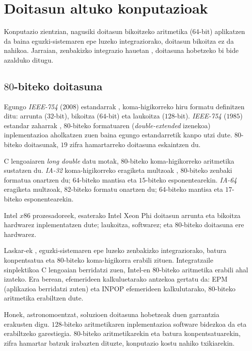 
\section{Doitasun altuko konputazioak}


Konputazio zientzian, nagusiki doitasun bikoitzeko aritmetika (64-bit) aplikatzen da baina eguzki-sistemaren epe luzeko integraziorako, doitasun bikoitza ez da nahikoa. Jarraian, zenbakizko integrazio hauetan \cite{Laskar2015}, doitasuna hobetzeko bi bide azalduko ditugu. 

\subsection*{$80$-biteko doitasuna}

Egungo \emph{IEEE-754} ($2008$) estandarrak , koma-higikorreko hiru formatu definitzen ditu: arrunta ($32$-bit), bikoitza ($64$-bit) eta laukoitza ($128$-bit).  \emph{IEEE-754} ($1985$) estandar zaharrak , $80$-biteko formatuaren (\emph{double-extended} izenekoa) inplementazioa aholkatzen zuen \cite{Overton2001} baina egungo estandarretik kanpo utzi dute. $80$-biteko doitasunak, $19$ zifra hamartarreko doitasuna eskaintzen du.   

C lengoaiaren \emph{long double} datu motak, $80$-biteko koma-higikorreko aritmetika sustatzen du.  \emph{IA-32} koma-higikorreko eragiketa multzoak \cite{Muller2009}, $80$-biteko zenbaki formatua onartzen du; $64$-biteko mantisa eta $15$-biteko esponentearekin. \emph{IA-64} eragiketa multzoak, $82$-biteko formatu onartzen du; $64$-biteko mantisa eta $17$-biteko esponentearekin. 

Intel $x86$  prozesadoreek, esaterako Intel Xeon Phi \cite{IntelXeon2013} doitasun arrunta eta bikoitza hardwarez inplementatzen dute; laukoitza, softwarez; eta $80$-biteko doitasuna ere hardwarez.

Laskar-ek \cite{Laskar2011,Laskar2015}, eguzki-sistemaren epe luzeko zenbakizko integraziorako, batura konpentsatua eta $80$-biteko koma-higikorra erabili zituen. Integratzaile sinplektikoa C lengoaian berridatzi zuen, Intel-en $80$-biteko aritmetika erabili ahal izateko.
Era berean, efemerideen kalkuluetarako antzekoa gertatu da: EPM \cite{Pitjeva2014} (aplikazioa berridatzi zuten) eta INPOP \cite{Fienga2008} efemerideen kalkulutarako, $80$-biteko aritmetika erabiltzen dute.

Honek, astronomoentzat, soluzioen doitasuna hobetzeak duen garrantzia erakusten digu. $128$-biteko aritmetikaren inplementazioa software bidezkoa da eta erabiltzeko garestiegia. $80$-biteko aritmetikarekin eta batura konpentsatuarekin, zifra hamartar batzuk irabazten dituzte, konputazio kostu nahiko txikiarekin. 

